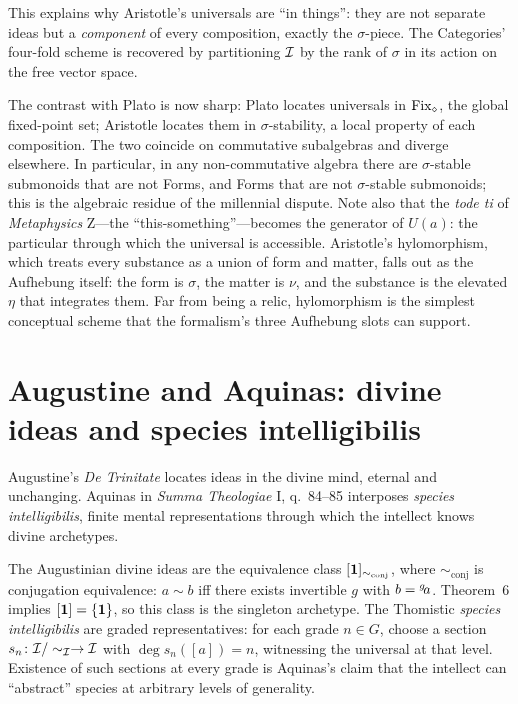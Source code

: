 \litcomment This explains why Aristotle's universals are ``in things'':
they are not separate ideas but a \emph{component} of every composition,
exactly the $\sigma$-piece. The Categories' four-fold scheme is recovered
by partitioning $\mathcal{I}$ by the rank of $\sigma$ in its action on the
free vector space.

The contrast with Plato is now sharp: Plato locates universals in
$\mathrm{Fix}_{\mathbin{\diamond}}$, the global fixed-point set; Aristotle
locates them in $\sigma$-stability, a local property of each
composition. The two coincide on commutative subalgebras and diverge
elsewhere. In particular, in any non-commutative algebra there are
$\sigma$-stable submonoids that are not Forms, and Forms that are not
$\sigma$-stable submonoids; this is the algebraic residue of the
millennial dispute. Note also that the \emph{tode ti} of
\emph{Metaphysics} $\mathrm{Z}$---the ``this-something''---becomes the
generator of $U(a)$: the particular through which the universal is
accessible. Aristotle's hylomorphism, which treats every substance as a
union of form and matter, falls out as the Aufhebung itself: the form
is $\sigma$, the matter is $\nu$, and the substance is the elevated
$\eta$ that integrates them. Far from being a relic, hylomorphism is
the simplest conceptual scheme that the formalism's three Aufhebung
slots can support.

\section{Augustine and Aquinas: divine ideas and species
intelligibilis}\label{sec:medieval}

 Augustine's \emph{De Trinitate}
\cite{AugustineDeTrinitate} locates ideas in the divine mind, eternal and
unchanging. Aquinas in \emph{Summa Theologiae} I, q.~84--85
\cite{AquinasST} interposes \emph{species intelligibilis}, finite mental
representations through which the intellect knows divine archetypes.

\formalclaim The Augustinian divine ideas are the equivalence class
$[\mathbf{1}]_{\sim_{\mathrm{conj}}}$, where $\sim_{\mathrm{conj}}$ is
conjugation equivalence: $a\sim b$ iff there exists invertible $g$ with
$b={}^{g}\!a$. Theorem~6 implies $[\mathbf{1}]=\{\mathbf{1}\}$, so this class is
the singleton archetype. The Thomistic \emph{species intelligibilis} are
graded representatives: for each grade $n\in G$, choose a section
$s_n\colon \mathcal{I}/\sim_{\mathcal{I}}\to\mathcal{I}$ with $\deg s_n([a])=n$, witnessing
the universal at that level. Existence of such sections at every grade
is Aquinas's claim that the intellect can ``abstract'' species at
arbitrary levels of generality.

